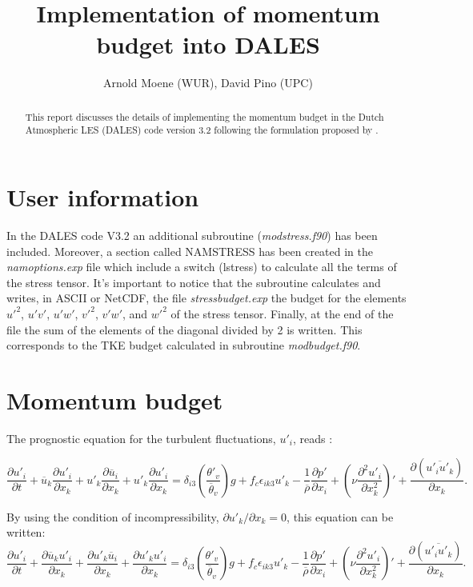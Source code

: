 \documentclass[10pt]{article}
\title{Implementation of momentum budget into DALES}
\author{Arnold Moene (WUR), David Pino (UPC)}
\begin{document}
\maketitle

\begin{abstract}
\noindent This report discusses the details of implementing the momentum budget in the Dutch 
Atmospheric LES (DALES) code version 3.2 following the formulation proposed by \cite{gao:balance}.
\end{abstract}

\section{User information}

In the DALES code V3.2 an additional subroutine ({\it modstress.f90}) has been included. 
Moreover, a section called NAMSTRESS has been created in the {\it namoptions.exp} file which include a switch (lstress) to calculate 
all the terms of the stress tensor. 
It's important to notice that the subroutine calculates and writes, in ASCII or NetCDF, the file 
{\it stressbudget.exp} the budget for the elements $u'^2$, $u'v'$, $u'w'$, $v'^2$, $v'w'$, and $w'^2$ of the stress tensor. 
Finally, at the end of the file the sum of the elements of the diagonal divided by 2 is written. This corresponds to the 
TKE budget calculated in subroutine {\it modbudget.f90}. 

\section{Momentum budget}
The prognostic equation for the turbulent fluctuations, $u'_i$, reads \citep[chapter 4, eq. 4.1.1]{stull:introbl}:

\begin{equation*}
  \frac{\partial u'_i}{\partial t} +  \overline{u}_k\frac{\partial u'_i}{\partial{x_k}} +
                                      u'_k\frac{\partial \overline{u}_i}{\partial{x_k}} +
                                      u'_k \frac{\partial u'_i}{\partial{x_k}} =
  \delta_{i3} \left( \frac{\theta'_v}{\overline{\theta}_v} \right) g +
   f_c \epsilon_{ik3} u'_k -
  \frac{1}{\overline{\rho}} \frac{\partial p'}{\partial x_i} + 
  \left(\nu \frac{\partial^2 u'_i}{\partial x^2_k}\right)' +
  \frac{\partial(\overline{u'_i u'_k})}{\partial x_k}.
\end{equation*}

By using the condition of incompressibility, $\partial u'_k/ \partial x_k=0$, this equation can be written:
\begin{equation}
  \frac{\partial u'_i}{\partial t} + \frac{\partial  \overline{u}_k u'_i}{\partial{x_k}} +
  \frac{\partial u'_k \overline{u}_i}{\partial{x_k}} +
  \frac{\partial u'_k u'_i}{\partial{x_k}} =
  \delta_{i3} \left( \frac{\theta'_v}{\overline{\theta}_v} \right) g +
  f_c \epsilon_{ik3} u'_k -
  \frac{1}{\overline{\rho}} \frac{\partial p'}{\partial x_i} + 
  \left(\nu \frac{\partial^2 u'_i}{\partial x^2_k}\right)'+
  \frac{\partial(\overline{u'_i u'_k})}{\partial x_k}. 
  \label{EQ_TEND_FLUCT}
\end{equation}
\end{document}
